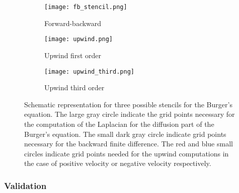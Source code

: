 \begin{figure}[!htbp]
\centering
\begin{subfigure}{.3\textwidth}
  \centering
  \texttt{[image: fb\_stencil.png]}
  \caption{Forward-backward}
  \label{fig:fb_stencil}
\end{subfigure}%
\begin{subfigure}{.3\textwidth}
  \centering
  \texttt{[image: upwind.png]}
  \caption{Upwind first order}
  \label{fig:upwind_stencil}
\end{subfigure}
\begin{subfigure}{.3\textwidth}
  \centering
  \texttt{[image: upwind\_third.png]}
  \caption{Upwind third order}
  \label{fig:upwind_third_stencil}
\end{subfigure}
\caption{Schematic representation for three possible stencils for the Burger's equation. The large gray circle indicate the grid points necessary for the computation of the Laplacian for the diffusion part of the Burger's equation. The small dark gray circle indicate grid points necessary for the backward finite difference. The red and blue small circles indicate grid points needed for the upwind computations in the case of positive velocity or negative velocity respectively.}
\label{fig:burger_stencils}
\end{figure}

\subsubsection{Validation}


